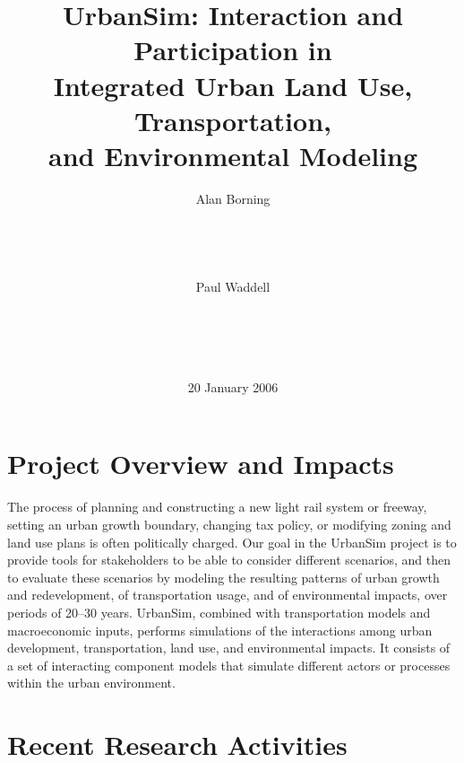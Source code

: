 \documentclass{acm_proc_article-sp}
\begin{document}
\title{UrbanSim: Interaction and Participation in \\
       Integrated Urban Land Use, Transportation, \\ 
       and Environmental Modeling}


\author{
\alignauthor Alan Borning\\
       \\
       \\
       \\
       \\
\alignauthor Paul Waddell\\
       \\
       \\
       \\
       \\
}
\date{20 January 2006}
\maketitle

\section{Project Overview and Impacts}

The process of planning and constructing a new light rail system
or freeway, setting an urban growth boundary, changing tax policy,
or modifying zoning and land use plans is often politically
charged.  Our goal in the UrbanSim project is to provide tools for
stakeholders to be able to consider different
scenarios,
and then to evaluate these scenarios by modeling the resulting
patterns of urban growth and redevelopment, of transportation
usage, and of environmental
impacts, over periods of 20--30 years.  UrbanSim,
combined with
transportation models and macroeconomic inputs, performs
simulations of the interactions among urban development,
transportation, land use, and environmental impacts. It consists
of a set of interacting component models that simulate different
actors or processes within the urban environment.

\section{Recent Research Activities}
\end{document}
